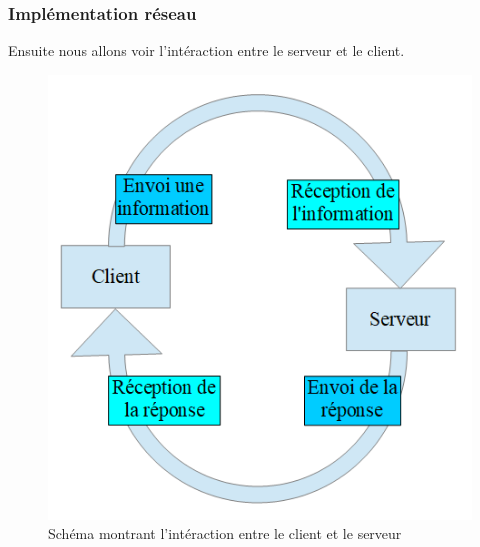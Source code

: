 \documentclass[a4paper,11pt]{article}
\begin{document}
\newpage

\subsubsection{Implémentation réseau}

Ensuite nous allons voir l'intéraction entre le serveur et le client.
\begin{figure}[h]
    \begin{center}
    \includegraphics[width=\textwidth] {socket.PNG}
    \caption{Schéma montrant l'intéraction entre le client et le serveur}
    \label{reseau}
    \end{center}
\end{figure}
\end{document}
